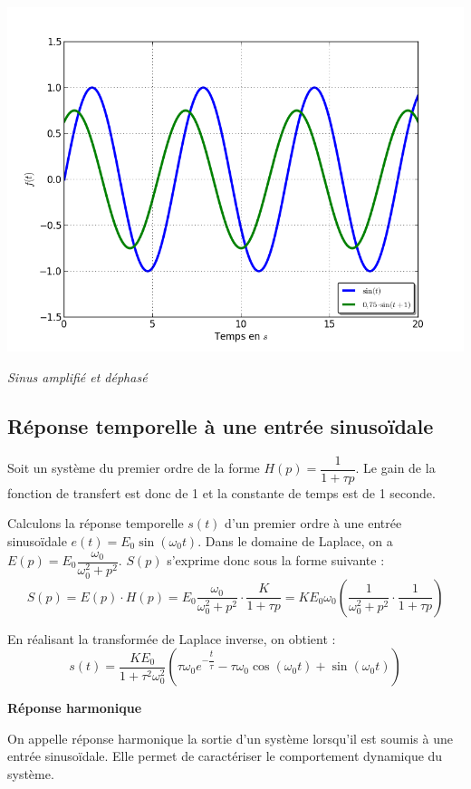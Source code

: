 \documentclass[10pt,oneside]{article}
\begin{document}
\begin{minipage}[c]{.3\linewidth}
\begin{center}
\includegraphics[width=.95\textwidth]{png/sinus_ampli_dephase}

\textit{Sinus amplifié et déphasé}
\end{center}
\end{minipage}


\subsection{Réponse temporelle à une entrée sinusoïdale}

Soit un système du premier ordre de la forme $H(p)=\dfrac{1}{1+\tau p}$. Le gain de la fonction de transfert est donc de 1 et la constante de temps est de 1 seconde. 

Calculons la réponse temporelle $s(t)$ d'un premier ordre à une entrée sinusoïdale $e(t)=E_0  \sin \left( \omega_0 t\right)$. Dans le domaine de Laplace, on a $E(p)=E_0\dfrac{\omega_0}{\omega_0^2+p^2}$. $S(p)$ s'exprime donc sous la forme suivante :
$$
S(p)=E(p)\cdot H(p) = E_0\dfrac{\omega_0}{\omega_0^2+p^2} \cdot \dfrac{K}{1+\tau p }
= KE_0\omega_0 \left( \dfrac{1}{\omega_0^2+p^2} \cdot \dfrac{1}{1+\tau p }\right)
$$

En réalisant la transformée de Laplace inverse, on obtient : 
$$
s(t)=\dfrac{KE_0}{1+\tau^2\omega_0^2} 
\left( 
\tau \omega_0  e^{-\dfrac{t}{\tau}} 
-\tau \omega_0  \cos \left( \omega_0 t \right)
+\sin \left( \omega_0 t\right)
\right)
$$



\begin{defi}
\textbf{Réponse harmonique}

On appelle réponse harmonique la sortie d'un système lorsqu'il est soumis à une entrée sinusoïdale. Elle permet de caractériser le comportement dynamique du système.
\end{defi}
\end{document}

